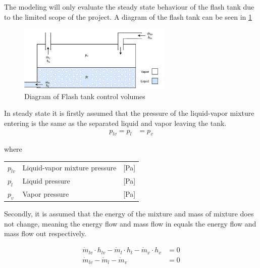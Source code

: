 The modeling will only evaluate the steady state behaviour of the flash tank due to the limited scope of the project. A diagram of the flash tank can be seen in \cref{fig:flash_tank_CV}

\begin{figure}[h!]
	\centering
	\includegraphics[width=0.65\textwidth]{Graphics/Flash_tank.pdf}
	\caption{Diagram of Flash tank control volumes}
	\label{fig:flash_tank_CV}
\end{figure}

In steady state it is firstly assumed that the pressure of the liquid-vapor mixture entering is the same as the separated liquid and vapor leaving the tank.
\begin{align}
	p_{lv} 	= p_{l}					&  = p_{v}
	\label{eq:Flash_tank_pressure}
\end{align}

where

\begin{center}
	\begin{tabular}{l p{8cm} l}
		$p_{lv}$				&  Liquid-vapor mixture pressure		& [\si{Pa}]\\
		$p_{l}$					&  Liquid pressure 						& [\si{Pa}] \\
		$p_{v}$					&  Vapor pressure						& [\si{Pa}]\\

	\end{tabular}
\end{center}


Secondly, it is assumed that the energy of the mixture and mass of mixture does not change, meaning the energy flow and mass flow in equals the energy flow and mass flow out respectively.

\begin{align}
	\dot{m}_{lv} \cdot  h_{lv}  - \dot{m}_{l} \cdot  h_{l} - \dot{m}_{v} \cdot  h_{v} & = 0 \label{eq:Flash_tank_energyflow} \\
	\dot{m}_{lv} - \dot{m}_{l} - \dot{m}_{v} & = 0  \label{eq:Flash_tank_massflow} \\
\end{align}

